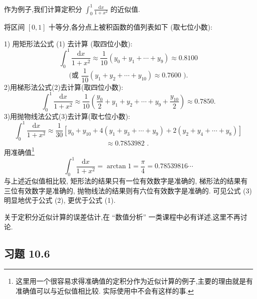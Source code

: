 作为例子,我们计算定积分 \({\int }_{0}^{1}\frac{\mathrm{d}x}{1 + {x}^{2}}\) 的近似值.

将区间 \(\left\lbrack  {0,1}\right\rbrack\) 十等分,各分点上被积函数的值列表如下 (取七位小数):

\begin{center}
\end{center}

1) 用矩形法公式 (1) 去计算 (取四位小数):
\[
{\int }_{0}^{1}\frac{\mathrm{d}x}{1 + {x}^{2}} \approx  \frac{1}{10}\left( {{y}_{0} + {y}_{1} + \cdots  + {y}_{9}}\right)  \approx  {0.8100}
\]
\[
\text{ (或 }\frac{1}{10}\left( {{y}_{1} + {y}_{2} + \cdots  + {y}_{10}}\right)  \approx  {0.7600}\text{ ). }
\]
2)用梯形法公式(2)去计算(取四位小数):
\[
{\int }_{0}^{1}\frac{\mathrm{d}x}{1 + {x}^{2}} \approx  \frac{1}{10}\left( {\frac{{y}_{0}}{2} + {y}_{1} + {y}_{2} + \cdots  + {y}_{9} + \frac{{y}_{10}}{2}}\right)  \approx  {0.7850}.
\]
3)用抛物线法公式(3)去计算(取七位小数):
\[
{\int }_{0}^{1}\frac{\mathrm{d}x}{1 + {x}^{2}} \approx  \frac{1}{30}\left\lbrack  {{y}_{0} + {y}_{10} + 4\left( {{y}_{1} + {y}_{3} + \cdots  + {y}_{9}}\right)  + 2\left( {{y}_{2} + {y}_{4} + \cdots  + {y}_{8}}\right) }\right\rbrack
\]
\[
\approx  {0.7853982}\text{ . }
\]
用准确值\footnote{这里用一个很容易求得准确值的定积分作为近似计算的例子,主要的理由就是有准确值可以与近似值相比较. 实际使用中不会有这样的事.}
\[
{\int }_{0}^{1}\frac{\mathrm{d}x}{1 + {x}^{2}} = \arctan 1 = \frac{\pi }{4} = {0.78539816}\cdots
\]
与上述近似值相比较, 矩形法的结果只有一位有效数字是准确的, 梯形法的结果有三位有效数字是准确的, 抛物线法的结果则有六位有效数字是准确的. 可见公式 (3) 明显地优于公式 (2), 更优于公式 (1).

关于定积分近似计算的误差估计,在 “数值分析” 一类课程中必有详述,这里不再讨论.

\subsection{习题 10.6}

